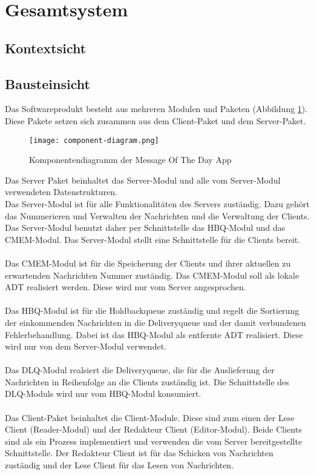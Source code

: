 \documentclass{article}
\begin{document}
\newpage

\section{Gesamtsystem}
\subsection{Kontextsicht}

\subsection{Bausteinsicht}
Das Softwareprodukt besteht aus mehreren Modulen und Paketen (Abbildung \ref{fig:component-diagram}). Diese Pakete setzen sich zusammen aus dem Client-Paket und dem Server-Paket.

\begin{figure}[H]
    \centering
    \texttt{[image: component-diagram.png]}
    \caption[seq-dia]{Komponentendiagramm der Message Of The Day App}
    \label{fig:component-diagram}
\end{figure}

Das Server Paket beinhaltet das Server-Modul und alle vom Server-Modul verwendeten Datenstrukturen.\\
Das Server-Modul ist für alle Funktionalitäten des Servers zuständig. Dazu gehört das Nummerieren und Verwalten der Nachrichten und die Verwaltung der Clients.\\
Das Server-Modul benutzt daher per Schnittstelle das HBQ-Modul und das CMEM-Modul. Das Server-Modul stellt eine Schnittstelle für die Clients bereit.\\
\\
Das CMEM-Modul ist für die Speicherung der Clients und ihrer aktuellen zu erwartenden Nachrichten Nummer zuständig. Das CMEM-Modul soll als lokale ADT realisiert werden. Diese wird nur vom Server angesprochen.\\
\\
Das HBQ-Modul ist für die Holdbackqueue zuständig und regelt die Sortierung der einkommenden Nachrichten in die Deliveryqueue und der damit verbundenen Fehlerbehandlung. Dabei ist das HBQ-Modul als entfernte ADT realisiert. Diese wird nur von dem Server-Modul verwendet.\\
\\
Das DLQ-Modul realsiert die Deliveryqueue, die für die Auslieferung der Nachrichten in Reihenfolge an die Clients zuständig ist. Die Schnittstelle des DLQ-Moduls wird nur vom HBQ-Modul konsumiert.\\
\\
Das Client-Paket beinhaltet die Client-Module. Diese sind zum einen der Lese Client (Reader-Modul) und der Redakteur Client (Editor-Modul). Beide Clients sind als ein Prozess implementiert und verwenden die vom Server bereitgestellte Schnittstelle. Der Redakteur Client ist für das Schicken von Nachrichten zuständig und der Lese Client für das Lesen von Nachrichten.
\end{document}
